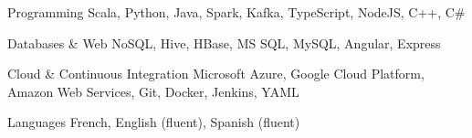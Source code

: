 \begin{cvskills}

	\cvskill
	{Programming}
	{Scala, Python, Java, Spark, Kafka, TypeScript, NodeJS, C++, C\#}

	\cvskill
	{Databases \& Web}
	{NoSQL, Hive, HBase, MS SQL, MySQL, Angular, Express}

	\cvskill
	{Cloud \& Continuous Integration}
	{Microsoft Azure, Google Cloud Platform, Amazon Web Services, Git, Docker, Jenkins, YAML}

	\cvskill
	{Languages}
	{French, English (fluent), Spanish (fluent)}

\end{cvskills}